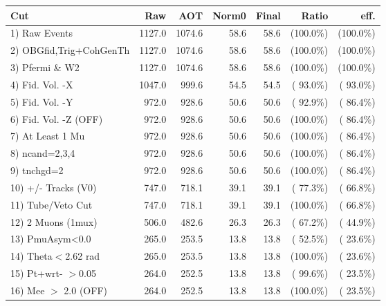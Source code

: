  \begin{table}[h!]\centering
 \begin{tabular}{||l||r|r|r|r|r|r||}
 \hline
 \hline
 Cut & Raw & AOT & Norm0 & Final & Ratio & eff.       \\
 \hline
  1) Raw Events           &       1127.0 &       1074.6 &         58.6 &         58.6 & (100.0\%) & (100.0\%) \\
  2) OBGfid,Trig+CohGenTh &       1127.0 &       1074.6 &         58.6 &         58.6 & (100.0\%) & (100.0\%) \\
  3) Pfermi \& W2         &       1127.0 &       1074.6 &         58.6 &         58.6 & (100.0\%) & (100.0\%) \\
  4) Fid. Vol. -X         &       1047.0 &        999.6 &         54.5 &         54.5 & ( 93.0\%) & ( 93.0\%) \\
  5) Fid. Vol. -Y         &        972.0 &        928.6 &         50.6 &         50.6 & ( 92.9\%) & ( 86.4\%) \\
  6) Fid. Vol. -Z (OFF)   &        972.0 &        928.6 &         50.6 &         50.6 & (100.0\%) & ( 86.4\%) \\
  7) At Least 1 Mu        &        972.0 &        928.6 &         50.6 &         50.6 & (100.0\%) & ( 86.4\%) \\
  8) ncand=2,3,4          &        972.0 &        928.6 &         50.6 &         50.6 & (100.0\%) & ( 86.4\%) \\
  9) tnchgd=2             &        972.0 &        928.6 &         50.6 &         50.6 & (100.0\%) & ( 86.4\%) \\
 10) +/- Tracks (V0)      &        747.0 &        718.1 &         39.1 &         39.1 & ( 77.3\%) & ( 66.8\%) \\
 11) Tube/Veto Cut        &        747.0 &        718.1 &         39.1 &         39.1 & (100.0\%) & ( 66.8\%) \\
 12) 2 Muons (1mux)       &        506.0 &        482.6 &         26.3 &         26.3 & ( 67.2\%) & ( 44.9\%) \\
 13) PmuAsym<0.0          &        265.0 &        253.5 &         13.8 &         13.8 & ( 52.5\%) & ( 23.6\%) \\
 14) Theta$<$2.62 rad     &        265.0 &        253.5 &         13.8 &         13.8 & (100.0\%) & ( 23.6\%) \\
 15) Pt+wrt- $>$0.05      &        264.0 &        252.5 &         13.8 &         13.8 & ( 99.6\%) & ( 23.5\%) \\
 16) Mee $>$ 2.0  (OFF)   &        264.0 &        252.5 &         13.8 &         13.8 & (100.0\%) & ( 23.5\%) \\

\end{tabular}
\end{table}
